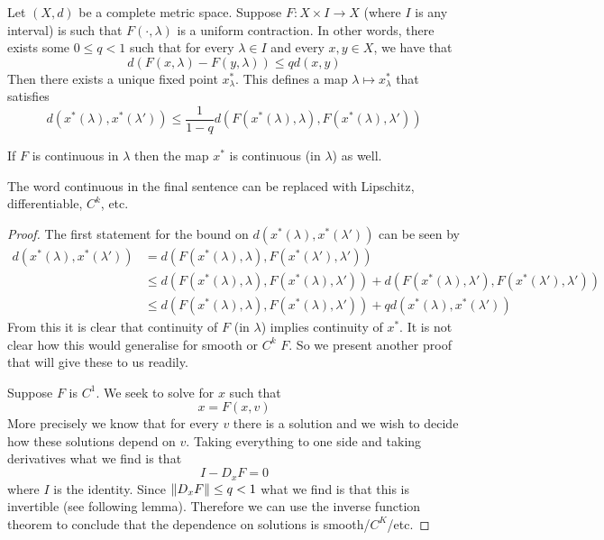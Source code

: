 \begin{theorem}\label{thm:solns-c1-and-stuff}
    Let $(X, d)$ be a complete metric space. Suppose $F: X \times I \to X$ (where $I$ is any interval) is such that $F(\cdot, \lambda)$ is a uniform contraction. In other words, there exists some $0 \leq q < 1$ such that for every $\lambda \in I$ and every $x, y \in X$, we have that
    $$ d(F(x, \lambda) - F(y, \lambda)) \leq q d(x, y) $$
    Then there exists a unique fixed point $x^*_{\lambda}$. This defines a map $\lambda \mapsto x^*_{\lambda}$ that satisfies
    $$ d(x^*(\lambda), x^*(\lambda')) \leq \frac{1}{1 - q} d(F(x^*(\lambda), \lambda), F(x^*(\lambda), \lambda')) $$
    
    If $F$ is continuous in $\lambda$ then the map $x^*$ is continuous (in $\lambda$) as well.
\end{theorem}
\begin{remark}
    The word continuous in the final sentence can be replaced with Lipschitz, differentiable, $C^k$, etc.
\end{remark}
\begin{proof}
    The first statement for the bound on $d(x^*(\lambda), x^*(\lambda'))$ can be seen by
    \begin{align*}
        d(x^*(\lambda), x^*(\lambda')) &= d( F(x^*(\lambda), \lambda), F(x^*(\lambda'), \lambda') )\\
        &\leq d(F(x^*(\lambda), \lambda), F(x^*(\lambda), \lambda')) + d(F(x^*(\lambda), \lambda'), F(x^*(\lambda'), \lambda'))\\
        &\leq d(F(x^*(\lambda), \lambda), F(x^*(\lambda), \lambda')) + q d(x^*(\lambda), x^*(\lambda'))
    \end{align*}
    From this it is clear that continuity of $F$ (in $\lambda$) implies continuity of $x^*$. It is not clear how this would generalise for smooth or $C^k$ $F$. So we present another proof that will give these to us readily.
    
    Suppose $F$ is $C^1$. We seek to solve for $x$ such that 
    $$ x = F(x, v) $$
    More precisely we know that for every $v$ there is a solution and we wish to decide how these solutions depend on $v$.
    Taking everything to one side and taking derivatives what we find is that
    $$ I - D_{x}F = 0 $$
    where $I$ is the identity. Since $\left\lVert D_{x}F\right\rVert \leq q < 1$ what we find is that this is invertible (see following lemma). Therefore we can use the inverse function theorem to conclude that the dependence on solutions is smooth/$C^K$/etc.
\end{proof}


